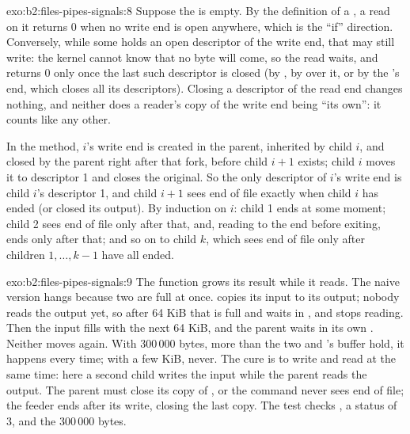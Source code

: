 \begin{solution}{exo:b2:files-pipes-signals:8}
Suppose the  is empty. By the definition of a , a read on it returns 0 when no write end is open anywhere,
which is the ``if'' direction. Conversely, while some  holds an open descriptor of the write end, that 
may still write: the kernel cannot know that no byte will come, so the read waits, and returns 0 only once the last
such descriptor is closed (by , by  over it, or by the 's end, which closes all its
descriptors). Closing a descriptor of the read end changes nothing, and neither does a reader's copy of the write end
being ``its own'': it counts like any other.

In the method,  $i$'s write end is created in the parent, inherited by child $i$, and closed by the parent right
after that fork, before child $i + 1$ exists; child $i$ moves it to descriptor 1 and closes the original. So the only
descriptor of  $i$'s write end is child $i$'s descriptor 1, and child $i + 1$ sees end of file exactly when child
$i$ has ended (or closed its output). By induction on $i$: child 1 ends at some moment; child 2 sees end of file only
after that, and, reading to the end before exiting, ends only after that; and so on to child $k$, which sees end of
file only after children $1, \dots, k-1$ have all ended.
\end{solution}

\begin{solution}{exo:b2:files-pipes-signals:9}
The function grows its result while it reads. The naive version hangs because two  are full at once. 
copies its input to its output; nobody reads the output yet, so after 64 KiB that  is full and  waits in
, and stops reading. Then the input  fills with the next 64 KiB, and the parent waits in its own
. Neither moves again. With 300\,000 bytes, more than the two  and 's buffer hold, it
happens every time; with a few KiB, never. The cure is to write and read at the same time: here a second child writes
the input while the parent reads the output. The parent must close its copy of , or the command never sees
end of file; the feeder ends after its write, closing the last copy. The test checks , a status of 3, and
the 300\,000 bytes.
\end{solution}

